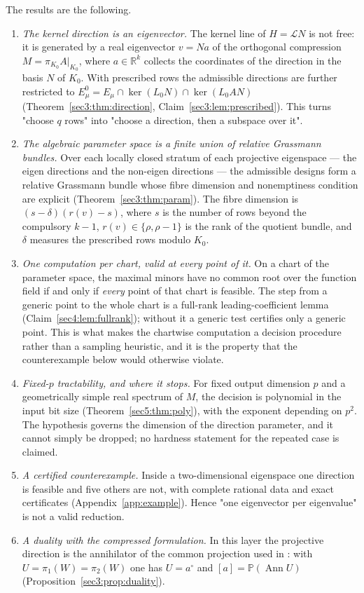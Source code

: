 \documentclass[journal]{IEEEtran}
\theoremstyle{plainn}
\theoremstyle{remark}
\newcommand{\Ann}{\operatorname{Ann}}
\begin{document}
The results are the following.

\begin{enumerate}[label=(\Alph*),leftmargin=*]
\item \emph{The kernel direction is an eigenvector.} The kernel line of $H=\mathcal LN$ is not free: it
is generated by a real eigenvector $v=Na$ of the orthogonal compression $M=\pi_{K_0}A|_{K_0}$, where
$a\in\mathbb R^k$ collects the coordinates of the direction in the basis $N$ of $K_0$. With prescribed
rows the admissible directions are further restricted to
$E_\mu^0=E_\mu\cap\ker(L_0N)\cap\ker(L_0AN)$ (Theorem~\ref{sec3:thm:direction},
Claim~\ref{sec3:lem:prescribed}). This turns "choose $q$ rows" into "choose a direction, then a
subspace over it".
\item \emph{The algebraic parameter space is a finite union of relative Grassmann bundles.} Over each
locally closed stratum of each projective eigenspace --- the eigen directions and the non-eigen
directions --- the admissible designs form a relative Grassmann bundle whose fibre dimension and
nonemptiness condition are explicit (Theorem~\ref{sec3:thm:param}). The fibre dimension is
$(s-\delta)(r(v)-s)$, where $s$ is the number of rows beyond the compulsory $k-1$, $r(v)\in\{\rho,\rho-1\}$
is the rank of the quotient bundle, and $\delta$ measures the prescribed rows modulo $K_0$.
\item \emph{One computation per chart, valid at every point of it.} On a chart of the parameter space,
the maximal minors have no common root over the function field if and only if \emph{every} point of
that chart is feasible. The step from a generic point to the whole chart is a full-rank
leading-coefficient lemma (Claim~\ref{sec4:lem:fullrank}); without it a generic test certifies only a
generic point. This is what makes the chartwise computation a decision procedure rather than a
sampling heuristic, and it is the property that the counterexample below would otherwise violate.
\item \emph{Fixed-$p$ tractability, and where it stops.} For fixed output dimension $p$ and a
geometrically simple real spectrum of $M$, the decision is polynomial in the input bit size
(Theorem~\ref{sec5:thm:poly}), with the exponent depending on $p^2$. The hypothesis governs the
dimension of the direction parameter, and it cannot simply be dropped; no hardness statement for the
repeated case is claimed.
\item \emph{A certified counterexample.} Inside a two-dimensional eigenspace one direction is feasible
and five others are not, with complete rational data and exact certificates
(Appendix~\ref{app:example}). Hence "one eigenvector per eigenvalue" is not a valid reduction.
\item \emph{A duality with the compressed formulation.} In this layer the projective direction is the
annihilator of the common projection used in \cite{companion2}: with $U=\pi_1(W)=\pi_2(W)$ one has
$U=a^\circ$ and $[a]=\mathbb P(\Ann U)$ (Proposition~\ref{sec3:prop:duality}).
\end{enumerate}
\end{document}
